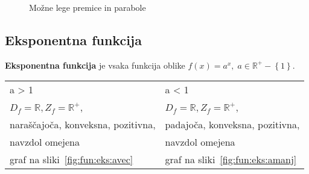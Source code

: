 \documentclass[a4paper,oneside,12pt,fleqn]{article}
\def\R{\ensuremath{\mathbb R}}
\newcommand{\beforecaptionskip}{\vspace{-12pt}}
\numberwithin{equation}{section}
\begin{document}
\begin{figure}[ht]
  \begin{center}
  \end{center}
  \beforecaptionskip
  \caption{Možne lege premice in parabole}
  \label{fig:fun:kvad:legapinp}
\end{figure}

\subsection{Eksponentna funkcija}
\label{sec:fun:eks}
\textbf{Eksponentna funkcija} je vsaka funkcija oblike $f(x) = a^x, \; a \in \R^+ - \left\{ 1
\right\}$.

\begin{tabular}{ll}
  a > 1 & a < 1 \\
  $D_f = \R, Z_f = \R^+$, & $D_f = \R, Z_f = \R^+$, \\
  naraščajoča, konveksna, pozitivna, & padajoča, konveksna, pozitivna, \\
  navzdol omejena & navzdol omejena \\
  graf na sliki~\ref{fig:fun:eks:avec} & graf na sliki~\ref{fig:fun:eks:amanj}
\end{tabular}
\end{document}
